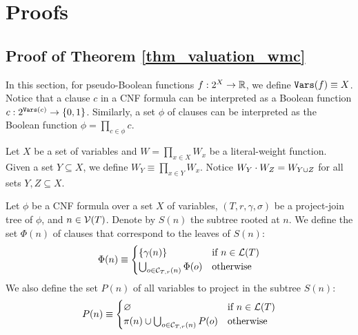 \section{Proofs}
\label{sec_proofs}



\subsection{Proof of Theorem \ref{thm_valuation_wmc}}

In this section, for pseudo-Boolean functions $f : 2^X \to \mathbb{R}$, we define $\texttt{\upshape Vars}(f) \equiv X$.
Notice that a clause $c$ in a CNF formula can be interpreted as a Boolean function $c : 2^{\texttt{\upshape Vars}(c)} \to \left\{ 0, 1 \right\}$.
Similarly, a set $\phi$ of clauses can be interpreted as the Boolean function $\phi = \prod_{c \in \phi} c$.

Let $X$ be a set of variables and $W = \prod_{x \in X} W_x$ be a literal-weight function.
Given a set $Y \subseteq X$, we define $W_{Y} \equiv \prod_{x \in Y} W_x$.
Notice $W_Y \cdot W_Z = W_{Y \cup Z}$ for all sets $Y, Z \subseteq X$.

Let $\phi$ be a CNF formula over a set $X$ of variables, $(T, r, \gamma, \sigma)$ be a project-join tree of $\phi$, and $n \in \mathcal{V}(T)$.
Denote by $S(n)$ the subtree rooted at $n$.
We define the set $\Phi(n)$ of clauses that correspond to the leaves of $S(n)$:
\begin{align*}
    \Phi(n) \equiv
    \begin{cases}
        \left\{ \gamma(n) \right\} & \text{if } n \in \mathcal{L}(T) \\
        \bigcup_{o \in \mathcal{C}_{T,r}(n)} \Phi(o) & \text{otherwise}
    \end{cases}
\end{align*}
We also define the set $P(n)$ of all variables to project in the subtree $S(n)$:
\begin{align*}
    P(n) \equiv
    \begin{cases}
       \varnothing & \text{if } n \in \mathcal{L}(T) \\
        \pi(n) \cup \bigcup_{o \in \mathcal{C}_{T,r}(n)} P(o) & \text{otherwise}
    \end{cases}
\end{align*}

